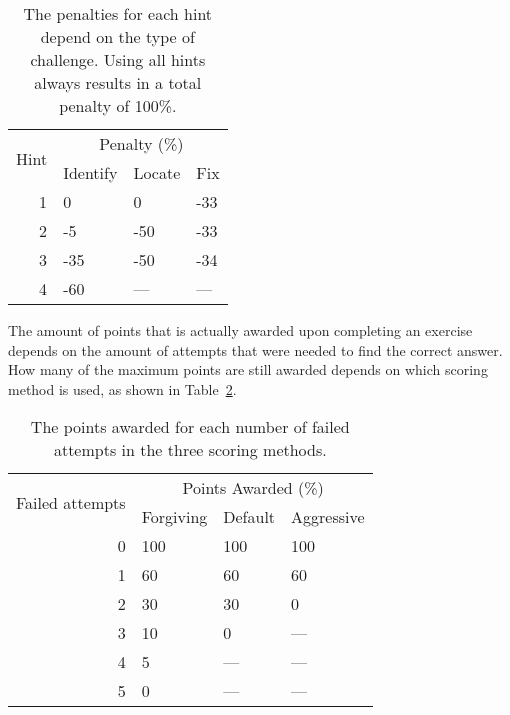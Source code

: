\begin{table}
\centering
\caption[Penalty for using hints]{The penalties for each hint depend on the type of challenge. Using all hints always results in a total penalty of 100\%.}
\begin{tabular}{r|lll} 
 \multirow{2}{*}{Hint} & \multicolumn{3}{c}{Penalty (\%)}\\
 & {Identify} & Locate & Fix \\
 \hline
 1 & 0 & 0 & -33\\
 2 & -5 & -50 & -33\\
 3 & -35 & -50 & -34\\
 4 & -60 & --- & --- \\
\end{tabular}
\label{tb:hints-scoring}
\end{table}

The amount of points that is actually awarded upon completing an exercise depends on the amount of attempts that were needed to find the correct answer. How many of the maximum points are still awarded depends on which scoring method is used, as shown in Table~\ref{tb:scoring-attempts}.

\begin{table}
\centering
\caption[Penalty for failed attempts]{The points awarded for each number of failed attempts in the three scoring methods.}
\begin{tabular}{r|lll} 
 \multirow{2}{*}{Failed attempts} & \multicolumn{3}{c}{Points Awarded (\%)}\\
 & Forgiving & Default & Aggressive \\
 \hline
 0 & 100 & 100 & 100\\
 1 & 60 & 60 & 60\\
 2 & 30 & 30 & 0\\
 3 & 10 & 0  & --- \\
 4 & 5  & --- & --- \\
 5 & 0  & --- & --- \\
\end{tabular}

\label{tb:scoring-attempts}
\end{table}


